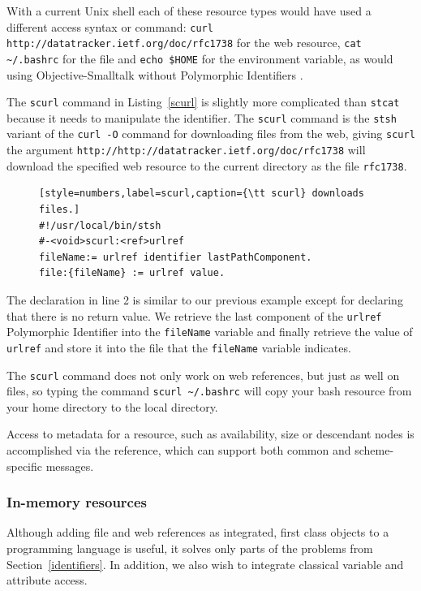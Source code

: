 \documentclass[preprint]{sigplanconf}
\begin{document}
With a current Unix shell each of these resource types would have used a different
access syntax or command:   {\tt curl http://datatracker.ietf.org/doc/rfc1738} for the
web resource, {\tt cat  \~\//.bashrc} for the file and {\tt echo \$HOME} for the environment
variable, as would using Objective-Smalltalk without Polymorphic Identifiers .

The {\tt scurl} command in Listing~\ref{scurl} is slightly more complicated than {\tt stcat} because
it needs to manipulate the identifier.  The {\tt scurl} command
is the {\tt stsh} variant of the {\tt curl -O} command for downloading files from the web, giving 
{\tt scurl} the argument {\tt http://http://datatracker.ietf.org/doc/rfc1738} will download the specified web resource
to the current directory as the file {\tt rfc1738}.


\begin{figure}[htbp]
\begin{lstlisting}[style=numbers,label=scurl,caption={\tt scurl} downloads files.]
#!/usr/local/bin/stsh
#-<void>scurl:<ref>urlref
fileName:= urlref identifier lastPathComponent.
file:{fileName} := urlref value.
\end{lstlisting}
\end{figure}


The declaration in line 2 is similar to our previous example except for declaring that there
is no return value.   We retrieve the last component of the {\tt urlref} Polymorphic Identifier into the {\tt fileName}
variable and finally retrieve the value of  {\tt urlref} and store it into the file that
the {\tt fileName} variable indicates.

The {\tt scurl} command does not only work on web references, but just as well
on files, so typing the command {\tt scurl \~\//.bashrc} will copy your bash resource from your home directory
to the local directory.

Access to metadata for a resource, such as availability, size or descendant nodes
is accomplished via the reference, which can support both common and scheme-specific
messages.

\subsubsection{In-memory resources}
\label{inmemory}

Although adding file and web references as integrated, first class objects to a programming
language is useful, it solves only parts of the problems from Section~\ref{identifiers}.
In addition, we also wish to integrate classical variable and attribute access.
\end{document}
